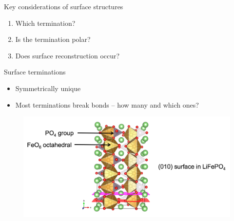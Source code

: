\documentclass[aspectratio=169]{beamer}
\begin{document}
    \begin{frame}{Key considerations of surface structures}
        \begin{enumerate}
            \item Which termination?
            \item Is the termination polar?
            \item Does surface reconstruction occur?
        \end{enumerate}

    \end{frame}

    \begin{frame}{Surface terminations}
        \begin{itemize}
            \item Symmetrically unique
            \item Most terminations break bonds – how many and which ones?
        \end{itemize}

        \begin{figure}
            \includegraphics[width=0.7\linewidth]{lectures/figures/11_LFP_terminations.png}
        \end{figure}

    \end{frame}
\end{document}
